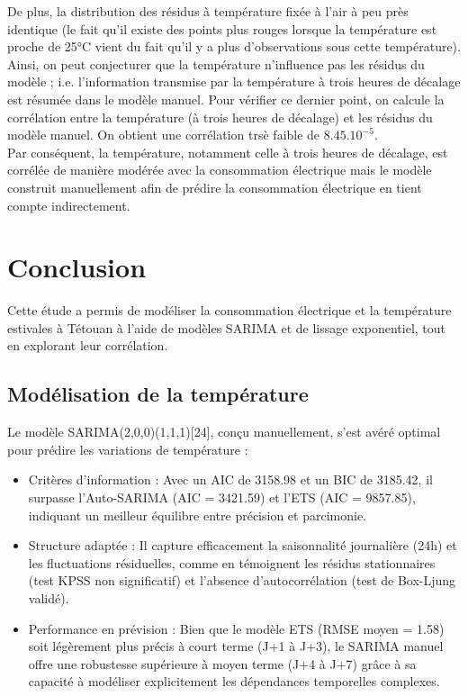 \documentclass{article}
\theoremstyle{definition}
\theoremstyle{remark}
\begin{document}
De plus, la distribution des résidus à température fixée à l'air à peu près identique (le fait qu'il existe des points plus rouges lorsque la température est proche de 25°C vient du fait qu'il y a plus d'observations sous cette température).\newline
Ainsi, on peut conjecturer que la température n'influence pas les résidus du modèle ; i.e. l'information transmise par la température à trois heures de décalage est résumée dans le modèle manuel.\newline
Pour vérifier ce dernier point, on calcule la corrélation entre la température (à trois heures de décalage) et les résidus du modèle manuel. On obtient une corrélation trsè faible de $8.45.10^{-5}$. 
\newline
\\
Par conséquent, la température, notamment celle à trois heures de décalage, est corrélée de manière modérée avec la consommation électrique mais le modèle construit manuellement afin de prédire la consommation électrique en tient compte indirectement.

\section*{Conclusion}
Cette étude a permis de modéliser la consommation électrique et la température estivales à Tétouan à l'aide de modèles SARIMA et de lissage exponentiel, tout en explorant leur corrélation.

\subsection*{Modélisation de la température}
Le modèle SARIMA(2,0,0)(1,1,1)[24], conçu manuellement, s'est avéré optimal pour prédire les variations de température :
\begin{itemize}
    \item Critères d'information : Avec un AIC de 3158.98 et un BIC de 3185.42, il surpasse l'Auto-SARIMA (AIC = 3421.59) et l'ETS (AIC = 9857.85), indiquant un meilleur équilibre entre précision et parcimonie.
    \item Structure adaptée : Il capture efficacement la saisonnalité journalière (24h) et les fluctuations résiduelles, comme en témoignent les résidus stationnaires (test KPSS non significatif) et l'absence d'autocorrélation (test de Box-Ljung validé).
    \item Performance en prévision : Bien que le modèle ETS (RMSE moyen = 1.58) soit légèrement plus précis à court terme (J+1 à J+3), le SARIMA manuel offre une robustesse supérieure à moyen terme (J+4 à J+7) grâce à sa capacité à modéliser explicitement les dépendances temporelles complexes.
\end{itemize}
\end{document}
